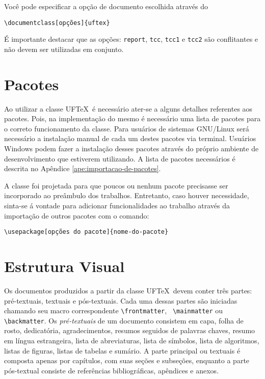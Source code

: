 \documentclass[report]{uftex}
\newcommand\uftex{UF\TeX}
\begin{document}
Você pode especificar a opção de documento escolhida através do \begin{verbatim}
\documentclass[opções]{uftex}
\end{verbatim}

É importante destacar que as opções: \verb+report+, \verb+tcc+, \verb+tcc1+ e \verb+tcc2+ são conflitantes e não devem ser utilizadas em conjunto.

\section{Pacotes}
\label{sec:pacotes}

\noindent Ao utilizar a classe \uftex\ é necessário ater-se a alguns detalhes referentes aos pacotes. Pois, na implementação do mesmo é necessário uma lista de pacotes para o correto funcionamento da classe. Para usuários de sistemas GNU/Linux será necessário a instalação manual de cada um destes pacotes via terminal. Usuários Windows podem fazer a instalação desses pacotes através do próprio ambiente de desenvolvimento que estiverem utilizando. A lista de pacotes necessários é descrita no Apêndice \ref{ape:importacao-de-pacotes}.

A classe foi projetada para que poucos ou nenhum pacote precisasse ser incorporado ao preâmbulo dos trabalhos. Entretanto, caso houver necessidade, sinta-se á vontade para adicionar funcionalidades ao trabalho através da importação de outros pacotes com o comando:

\begin{verbatim}
\usepackage[opções do pacote]{nome-do-pacote}
\end{verbatim}


\section{Estrutura Visual}
\label{sec:contribucoes}

\noindent Os documentos produzidos a partir da classe \uftex\ devem conter três partes: pré-textuais, textuais e pós-textuais. Cada uma dessas partes são iniciadas chamando seu macro correspondente \verb+\frontmatter+, \verb+ \mainmatter+ ou \verb+\backmatter+. Os \emph{pré-textuais} de um documento consistem em capa, folha de rosto, dedicatória, agradecimentos, resumos seguidos de palavras chaves, resumo em língua estrangeira, lista de abreviaturas, lista de símbolos, lista de algoritmos, listas de figuras, listas de tabelas e sumário. A parte principal ou textuais é composta apenas por capítulos, com suas seções e subseções, enquanto a parte pós-textual consiste de referências bibliográficas, apêndices e anexos.
\end{document}
